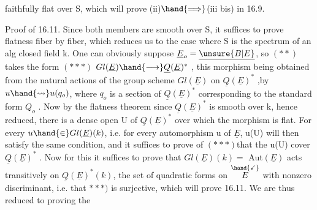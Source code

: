 
faithfully flat over S, which will prove (ii)$\hand{\Longrightarrow}$(iii bis) in 16.9.

Proof of 16.11. Since both members are smooth over S,
it suffices to prove flatness fiber by fiber, which reduces us to the
case where S is the spectrum of an alg closed field k. One can  obviously suppose
$\underline{E}_o=\underline{\unsure{B|E}}$, so $(**)$ takes the form
$(***)$   $Gl(\underline{E})\hand{\longrightarrow}\underline{Q}(\underline{E})^*$ ,
this morphism being obtained from the natural actions of the group scheme
$Gl(\underline{E})$ on $\underline{Q}(\underline{E})^*$ ,by $u\hand{\rightsquigarrow} u(q_o)$, where $q_o$ is a section of $\underline{Q}(\underline{E})^*$ corresponding
to the standard form $Q_o$ . Now by the  flatness theorem\hand{,}
since $\underline{Q}(\underline{E})^*$ is smooth over k, hence reduced, there is a dense open U of
$\underline{Q}(\underline{E})^*$ over which the  morphism is flat. For every 
$u\hand{\in}Gl(\underline{E})(k)$, i.e. for every automorphism u of $\underline{E}$, u(U) will then
satisfy the same condition, and it suffices\hand{$\unsure{\leftarrow}$} to prove\hand{,} \hand{$\downarrow$}
of $(***)$\hand{,}that the u(U) cover $\underline{Q}(\underline{E})^*$ . Now for this it suffices to prove
that $Gl(\underline{E})(k)=$ Aut$(\underline{E})$ acts transitively on $\underline{Q}(\underline{E})^*(k)$, the set of
quadratic forms  on $\overset{\hand{\checkmark}}{E}$ with nonzero discriminant,  i.e. that
$***)$ is surjective, which will  prove 16.11. We are thus reduced to
proving the

